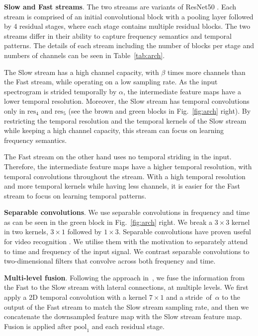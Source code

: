 \documentclass{article}
\begin{document}
\noindent\textbf{Slow and Fast streams}. The two streams are variants of ResNet50 \cite{He_2016_CVPR}. Each stream is comprised of an initial convolutional block with a pooling layer followed by 4 residual stages, where each stage contains multiple residual blocks. 
The two streams differ in their ability to capture frequency semantics and temporal patterns.
The details of each stream including the number of blocks per stage and numbers of channels can be seen in Table~\ref{tab:arch}. 

The Slow stream has a high channel capacity, with $\beta$ times more channels than the Fast stream, while operating on a low sampling rate. As the input spectrogram is strided temporally by $\alpha$, the intermediate feature maps have a lower temporal resolution. Moreover, the Slow stream has temporal convolutions only in $\text{res}_{\text{4}}$ and $\text{res}_{\text{5}}$ (see the brown and green blocks in Fig.~\ref{fig:arch} right). By restricting the temporal resolution and the temporal kernels of the Slow stream while keeping a high channel capacity, this stream can focus on learning frequency semantics. 

The Fast stream on the other hand uses no temporal striding in the input. Therefore, the intermediate feature maps have a higher temporal resolution, with temporal convolutions throughout the stream. With a high temporal resolution and more temporal kernels while having less channels, it is easier for the Fast stream to focus on learning temporal patterns.

\noindent\textbf{Separable convolutions}. 
We use separable convolutions in frequency and time as can be seen in the green block in Fig.~\ref{fig:arch} right. We break a $3\times3$ kernel in two kernels, $3\times1$ followed by $1\times3$. 
Separable convolutions have proven useful for video recognition \cite{Tran_2018_CVPR}. We utilise them with the motivation to separately attend to time and frequency of the input signal. We contrast separable convolutions to two-dimensional filters that convolve across both frequency and time. 

\noindent\textbf{Multi-level fusion}. 
Following the approach in~\cite{Feichtenhofer_2019_ICCV}, we fuse the information from the Fast to the Slow stream with lateral connections, at multiple levels. 
We first apply a 2D temporal convolution with a kernel $7\times1$ and a stride~of~$\alpha$ to the output of the Fast stream to match the Slow stream sampling rate, and then we concatenate the downsampled feature map with the Slow stream feature map. Fusion is applied after $\text{pool}_\text{1}$ and each residual stage.   
\end{document}
